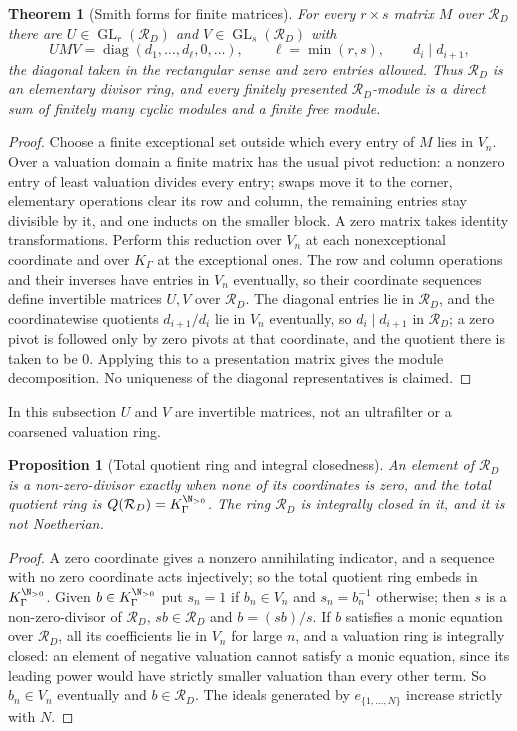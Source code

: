 \documentclass[11pt]{article}
\newtheorem{theorem}{Theorem}[section]
\theoremstyle{plain}
\theoremstyle{plain}
\newtheorem{proposition}[proposition]{Proposition}
\theoremstyle{plain}
\theoremstyle{definition}
\theoremstyle{definition}
\theoremstyle{definition}
\theoremstyle{definition}
\theoremstyle{remark}
\newcommand{\RD}{\mathcal R_D}\newcommand{\Ucal}{\mathcal U}
\begin{document}
\begin{theorem}[Smith forms for finite matrices]\label{ent:ps:thm:smith}
For every $r\times s$ matrix $M$ over $\RD$ there are
$U\in\operatorname{GL}_r(\RD)$ and $V\in\operatorname{GL}_s(\RD)$ with
\[
 UMV=\operatorname{diag}(d_1,\ldots,d_\ell,0,\ldots),\qquad
 \ell=\min(r,s),\qquad d_i\mid d_{i+1},
\]
the diagonal taken in the rectangular sense and zero entries allowed. Thus
$\RD$ is an elementary divisor ring, and every finitely presented
$\RD$-module is a direct sum of finitely many cyclic modules and a finite
free module.
\end{theorem}
\begin{proof}
Choose a finite exceptional set outside which every entry of $M$ lies in
$V_n$. Over a valuation domain a finite matrix has the usual pivot
reduction: a nonzero entry of least valuation divides every entry; swaps move
it to the corner, elementary operations clear its row and column, the
remaining entries stay divisible by it, and one inducts on the smaller block.
A zero matrix takes identity transformations. Perform this reduction over
$V_n$ at each nonexceptional coordinate and over $K_\Gamma$ at the
exceptional ones. The row and column operations and their inverses have
entries in $V_n$ eventually, so their coordinate sequences define invertible
matrices $U,V$ over $\RD$. The diagonal entries lie in $\RD$, and the
coordinatewise quotients $d_{i+1}/d_i$ lie in $V_n$ eventually, so
$d_i\mid d_{i+1}$ in $\RD$; a zero pivot is followed only by zero pivots at
that coordinate, and the quotient there is taken to be $0$. Applying this to
a presentation matrix gives the module decomposition. No uniqueness of the
diagonal representatives is claimed.
\end{proof}

In this subsection $U$ and $V$ are invertible matrices, not an ultrafilter or
a coarsened valuation ring.

\begin{proposition}[Total quotient ring and integral closedness]
\label{ent:ps:prop:total-quotient}
An element of $\RD$ is a non-zero-divisor exactly when none of its
coordinates is zero, and the total quotient ring is
$Q(\RD)=K_\Gamma^{\N_{>0}}$. The ring $\RD$ is integrally closed in it, and
it is not Noetherian.
\end{proposition}
\begin{proof}
A zero coordinate gives a nonzero annihilating indicator, and a sequence with
no zero coordinate acts injectively; so the total quotient ring embeds in
$K_\Gamma^{\N_{>0}}$. Given $b\in K_\Gamma^{\N_{>0}}$ put $s_n=1$ if
$b_n\in V_n$ and $s_n=b_n^{-1}$ otherwise; then $s$ is a non-zero-divisor of
$\RD$, $sb\in\RD$ and $b=(sb)/s$. If $b$ satisfies a monic equation over
$\RD$, all its coefficients lie in $V_n$ for large $n$, and a valuation ring
is integrally closed: an element of negative valuation cannot satisfy a monic
equation, since its leading power would have strictly smaller valuation than
every other term. So $b_n\in V_n$ eventually and $b\in\RD$. The ideals
generated by $e_{\{1,\ldots,N\}}$ increase strictly with $N$.
\end{proof}
\end{document}
